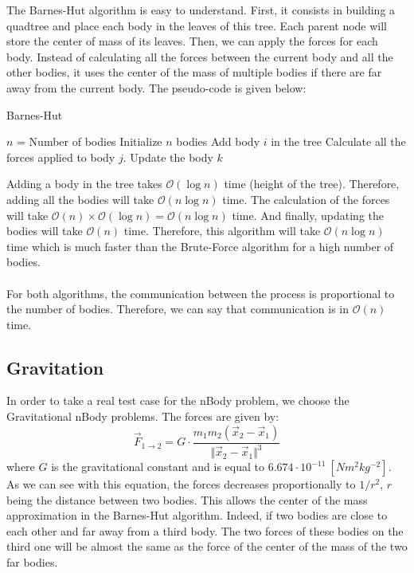 \documentclass[11pt,a4paper]{article}
\begin{document}
The Barnes-Hut algorithm is easy to understand. First, it consists in building a quadtree and place each body in the leaves of this tree. Each parent node will store the center of mass of its leaves. Then, we can apply the forces for each body. Instead of calculating all the forces between the current body and all the other bodies, it uses the center of the mass of multiple bodies if there are far away from the current body. The pseudo-code is given below:
\begin{algorithm}
\caption{Barnes-Hut}\label{bh}
\begin{algorithmic}[1]
\State $n$ = Number of bodies
\State Initialize $n$ bodies
\State	Add body $i$ in the tree
\EndFor
{} 
\State	Calculate all the forces applied to body $j$.
\EndFor	
{}
\State Update the body $k$
\EndFor
\EndWhile
\end{algorithmic}
\end{algorithm}

Adding a body in the tree takes $\mathcal{O}(\log n)$ time (height of the tree). Therefore, adding all the bodies will take $\mathcal{O}(n\log n)$ time. The calculation of the forces will take $\mathcal{O}(n) \times \mathcal{O}(\log n) = \mathcal{O}(n\log n)$ time. And finally, updating the bodies will take $\mathcal{O}(n)$ time. Therefore, this algorithm will take $\mathcal{O}(n\log n)$ time which is much faster than the Brute-Force algorithm for a high number of bodies.
\\\\
For both algorithms, the communication between the process is proportional to the number of bodies. Therefore, we can say that communication is in $\mathcal{O}(n)$ time.

\subsection{Gravitation} 

In order to take a real test case for the nBody problem, we choose the Gravitational nBody problems. The forces are given by:
\begin{equation}
\vec{F}_{1\rightarrow 2} = G\cdot\frac{m_1m_2(\vec{x}_2-\vec{x}_1)}{\Vert \vec{x}_2-\vec{x}_1\Vert^3}
\end{equation}
where $G$ is the gravitational constant and is equal to $6.674 \cdot 10^{-11}~[Nm^2kg^{-2}]$. As we can see with this equation, the forces decreases proportionally to $1/r^2$, $r$ being the distance between two bodies. This allows the center of the mass approximation in the Barnes-Hut algorithm. Indeed, if two bodies are close to each other and far away from a third body. The two forces of these bodies on the third one will be almost the same as the force of the center of the mass of the two far bodies.
\end{document}
